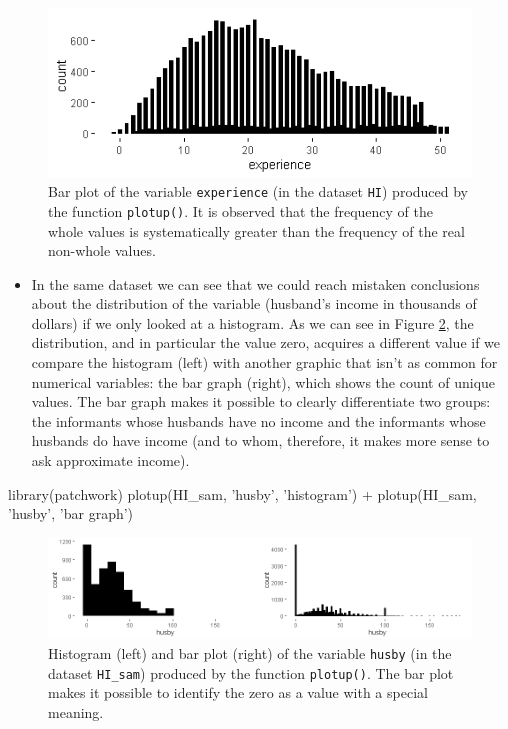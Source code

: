 \begin{Schunk}
	\begin{figure}[H]
\includegraphics[width=0.5\linewidth]{figures/HI_1-1} \caption[Identification of rounded values]{Bar plot of the variable \texttt{experience} (in the dataset \texttt{HI}) produced by the function \texttt{plotup()}. It is observed that the frequency of the whole values is systematically greater than the frequency of the real non-whole values.}\label{fig:HI_1}
	\end{figure}
\end{Schunk}

\begin{itemize}
	\tightlist
	\item
	In the same dataset we can see that we could reach mistaken
	conclusions about the distribution of the variable 
	(husband's income in thousands of dollars) if we only looked at a
	histogram. As we can see in Figure \ref{fig:HI_2}, the distribution,
	and in particular the value zero, acquires a different value if we
	compare the histogram (left) with another graphic that isn't as
	common for numerical variables: the bar graph (right), which shows the
	count of unique values. The bar graph makes it possible to clearly
	differentiate two groups: the informants whose husbands have no income
	and the informants whose husbands do have income (and to whom,
	therefore, it makes more sense to ask approximate income).
\end{itemize}

\begin{example}
  library(patchwork)
  plotup(HI_sam, 'husby', 'histogram') + plotup(HI_sam, 'husby', 'bar graph')
\end{example}

\begin{Schunk}
	\begin{figure}[H]
\includegraphics[width=1\linewidth]{figures/HI_2-1} \caption[Identification of values with a special meaning]{Histogram (left) and bar plot (right) of the variable \texttt{husby} (in the dataset \texttt{HI\_sam}) produced by the function \texttt{plotup()}. The bar plot makes it possible to identify the zero as a value with a special meaning.}\label{fig:HI_2}
	\end{figure}
\end{Schunk}

